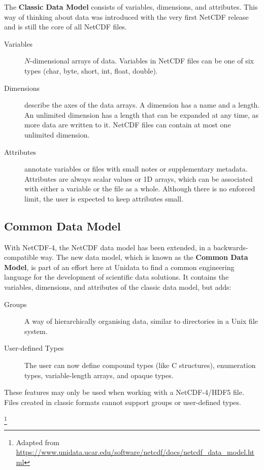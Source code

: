 {\itshape

The \textbf{Classic Data Model} consists of variables, dimensions, and attributes. This way of thinking about data was introduced with the very first NetCDF release and is still the core of all NetCDF files.

\begin{description}

\item[Variables] $N$-dimensional arrays of data. Variables in NetCDF files can be one of six types (char, byte, short, int, float, double).

\item[Dimensions] describe the axes of the data arrays. A dimension has a name and a length. An unlimited dimension has a length that can be expanded at any time, as more data are written to it. NetCDF files can contain at most one unlimited dimension.

\item[Attributes] annotate variables or files with small notes or supplementary metadata. Attributes are always scalar values or 1D arrays, which can be associated with either a variable or the file as a whole. Although there is no enforced limit, the user is expected to keep attributes small.

\end{description}

\subsection{Common Data Model}
\label{sec:common}

With NetCDF-4, the NetCDF data model has been extended, in a backwards-compatible way. The new data model, which is known as the \textbf{Common Data Model}, is part of an effort here at Unidata to find a common engineering language for the development of scientific data solutions. It contains the variables, dimensions, and attributes of the classic data model, but adds:

\begin{description}

\item[Groups] A way of hierarchically organising data, similar to directories in a Unix file system.

\item[User-defined Types] The user can now define compound types (like C structures), enumeration types, variable-length arrays, and opaque types.

\end{description}

These features may only be used when working with a NetCDF-4/HDF5 file.
Files created in classic formats cannot support groups or user-defined types.
}\footnote{Adapted from \url{https://www.unidata.ucar.edu/software/netcdf/docs/netcdf_data_model.html}}

